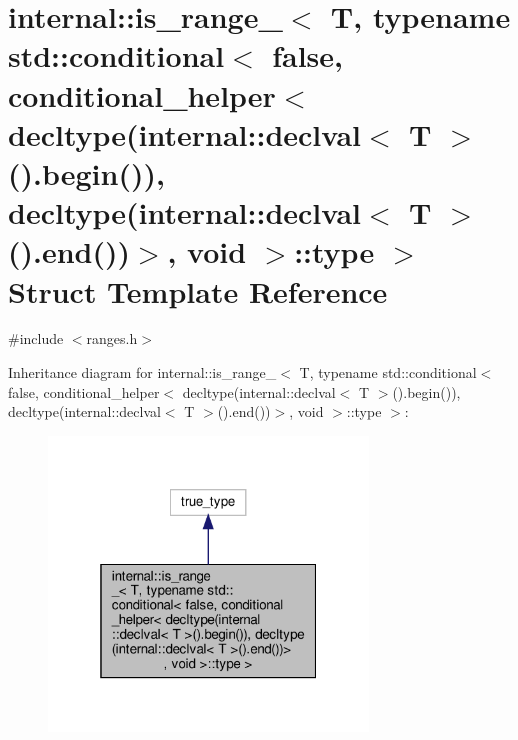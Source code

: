 \hypertarget{structinternal_1_1is__range___3_01_t_00_01typename_01std_1_1conditional_3_01false_00_01condition3cb3b849b8281fb701deab896849f46a}{}\section{internal\+:\+:is\+\_\+range\+\_\+$<$ T, typename std\+:\+:conditional$<$ false, conditional\+\_\+helper$<$ decltype(internal\+:\+:declval$<$ T $>$().begin()), decltype(internal\+:\+:declval$<$ T $>$().end())$>$, void $>$\+:\+:type $>$ Struct Template Reference}
\label{structinternal_1_1is__range___3_01_t_00_01typename_01std_1_1conditional_3_01false_00_01condition3cb3b849b8281fb701deab896849f46a}


{\ttfamily \#include $<$ranges.\+h$>$}



Inheritance diagram for internal\+:\+:is\+\_\+range\+\_\+$<$ T, typename std\+:\+:conditional$<$ false, conditional\+\_\+helper$<$ decltype(internal\+:\+:declval$<$ T $>$().begin()), decltype(internal\+:\+:declval$<$ T $>$().end())$>$, void $>$\+:\+:type $>$\+:
\nopagebreak
\begin{figure}[H]
\begin{center}
\leavevmode
\includegraphics[width=241pt]{structinternal_1_1is__range___3_01_t_00_01typename_01std_1_1conditional_3_01false_00_01condition4073dc1146fd039ed5777a14926af8bb}
\end{center}
\end{figure}


